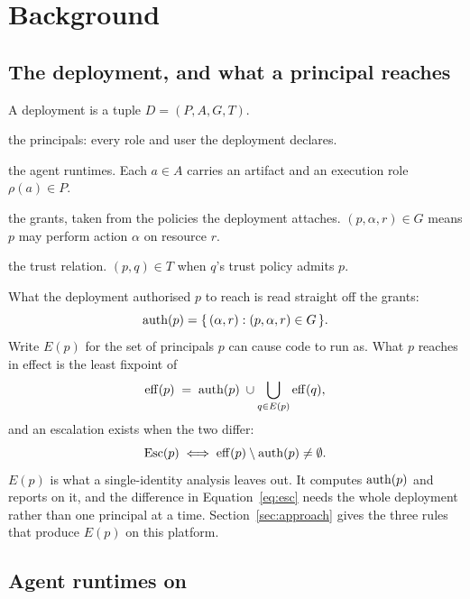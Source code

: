 \section{Background}
\label{sec:background}

\subsection{The deployment, and what a principal reaches}
\label{sec:model}

A deployment is a tuple $D = (P, A, G, T)$.

\begin{description}
\itemsep1pt
\item[$P$] the principals: every role and user the deployment declares.
\item[$A$] the agent runtimes. Each $a \in A$ carries an artifact and an
  execution role $\rho(a) \in P$.
\item[$G \subseteq P \times \mathit{Act} \times \mathit{Res}$] the grants,
  taken from the policies the deployment attaches. $(p, \alpha, r) \in G$
  means $p$ may perform action $\alpha$ on resource $r$.
\item[$T \subseteq P \times P$] the trust relation. $(p,q) \in T$ when $q$'s
  trust policy admits $p$.
\end{description}

What the deployment authorised $p$ to reach is read straight off the grants:
%
\begin{equation}
\label{eq:auth}
\mathrm{auth}(p) = \{\, (\alpha, r) : (p, \alpha, r) \in G \,\}.
\end{equation}
%
Write $E(p)$ for the set of principals $p$ can cause code to run as. What $p$
reaches in effect is the least fixpoint of
%
\begin{equation}
\label{eq:eff}
\mathrm{eff}(p) \;=\; \mathrm{auth}(p) \;\cup \bigcup_{q \in E(p)} \mathrm{eff}(q),
\end{equation}
%
and an escalation exists when the two differ:
%
\begin{equation}
\label{eq:esc}
\mathrm{Esc}(p) \iff \mathrm{eff}(p) \setminus \mathrm{auth}(p) \neq \emptyset .
\end{equation}
%
$E(p)$ is what a single-identity analysis leaves out. It computes $\mathrm{auth}(p)$
and reports on it, and the difference in Equation~\ref{eq:esc} needs the whole
deployment rather than one principal at a time.
Section~\ref{sec:approach} gives the three rules that produce $E(p)$ on this
platform.

\subsection{Agent runtimes on \agentcore}

